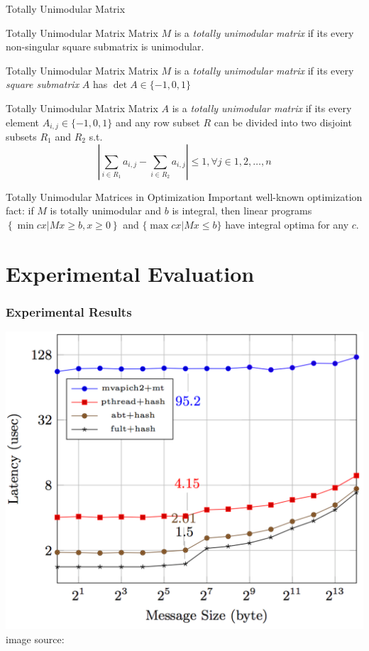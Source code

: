 \documentclass[presentation,professionalfonts]{beamer}
\begin{document}
\begin{frame}{Totally Unimodular Matrix}
  \begin{definition}{Totally Unimodular Matrix}
    Matrix \(M\) is a \emph{totally unimodular matrix} if its every
    non-singular square submatrix is unimodular.
  \end{definition}

  \begin{definition}{Totally Unimodular Matrix}
    Matrix \(M\) is a \emph{totally unimodular matrix} if its every
    \emph{square submatrix} \(A\) has \(\det A\in \{-1, 0, 1\}\)
  \end{definition}

  \begin{definition}{Totally Unimodular Matrix}
    Matrix \(A\) is a \emph{totally unimodular matrix} if its every
    element \(A_{i, j}\in \{-1, 0, 1\}\) and any row subset \(R\) can
    be divided into two disjoint subsets \(R_1\) and \(R_2\) s.t.
    \[\left|\sum_{i\in R_1} a_{i, j} - \sum_{i\in R_2}a_{i, j}\right| \leq 1, \forall j\in{1, 2, \dots, n}\]
    \end{definition}
\end{frame}

\begin{frame}{Totally Unimodular Matrices in Optimization}
  Important well-known optimization fact: if \(M\) is totally
  unimodular and \(b\) is integral, then linear programs \(\left\{\min
  cx | Mx \geq b, x\geq 0\right\}\) and \(\{\max cx | Mx \leq b\}\)
  have integral optima for any \(c\).
  \end{frame}

\section{Experimental Evaluation}

\begin{frame}
  \frametitle{Experimental Results}
  \begin{center}
  \includegraphics[width=.7\textwidth]{./graph1}\\
  image source: \textcite{Dang16}
  \end{center}
\end{frame}
\end{document}
